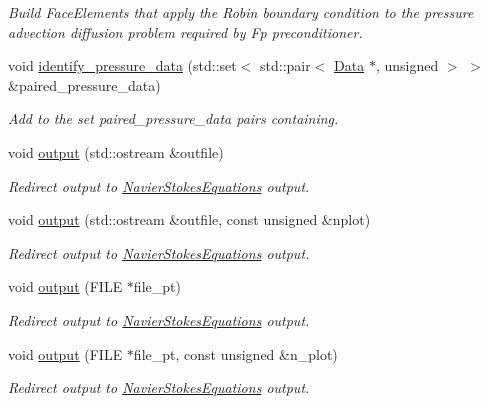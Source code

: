 \begin{DoxyCompactItemize}
\begin{DoxyCompactList}\small\item\em Build Face\+Elements that apply the Robin boundary condition to the pressure advection diffusion problem required by Fp preconditioner. \end{DoxyCompactList}\item 
void \hyperlink{classoomph_1_1AxisymmetricTTaylorHoodElement_a20b2bcc3563aaa264601603a0d3b3604}{identify\+\_\+pressure\+\_\+data} (std\+::set$<$ std\+::pair$<$ \hyperlink{classoomph_1_1Data}{Data} $\ast$, unsigned $>$ $>$ \&paired\+\_\+pressure\+\_\+data)
\begin{DoxyCompactList}\small\item\em Add to the set {\ttfamily paired\+\_\+pressure\+\_\+data} pairs containing. \end{DoxyCompactList}\item 
void \hyperlink{classoomph_1_1AxisymmetricTTaylorHoodElement_a538cd24096fa521e0dac0f1f78ce5446}{output} (std\+::ostream \&outfile)
\begin{DoxyCompactList}\small\item\em Redirect output to \hyperlink{classoomph_1_1NavierStokesEquations}{Navier\+Stokes\+Equations} output. \end{DoxyCompactList}\item 
void \hyperlink{classoomph_1_1AxisymmetricTTaylorHoodElement_a10ec676703edbf68120256082aa8c290}{output} (std\+::ostream \&outfile, const unsigned \&nplot)
\begin{DoxyCompactList}\small\item\em Redirect output to \hyperlink{classoomph_1_1NavierStokesEquations}{Navier\+Stokes\+Equations} output. \end{DoxyCompactList}\item 
void \hyperlink{classoomph_1_1AxisymmetricTTaylorHoodElement_a0b1f01968fd84b28009339e5e478a683}{output} (F\+I\+LE $\ast$file\+\_\+pt)
\begin{DoxyCompactList}\small\item\em Redirect output to \hyperlink{classoomph_1_1NavierStokesEquations}{Navier\+Stokes\+Equations} output. \end{DoxyCompactList}\item 
void \hyperlink{classoomph_1_1AxisymmetricTTaylorHoodElement_abc6435ee0ad7a9235b1fc57451f1872c}{output} (F\+I\+LE $\ast$file\+\_\+pt, const unsigned \&n\+\_\+plot)
\begin{DoxyCompactList}\small\item\em Redirect output to \hyperlink{classoomph_1_1NavierStokesEquations}{Navier\+Stokes\+Equations} output. \end{DoxyCompactList}\item 

\end{DoxyCompactItemize}
